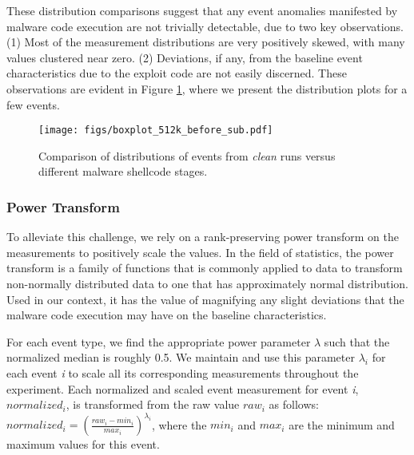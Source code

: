 \documentclass{acm_proc_article-sp}
\begin{document}

These distribution comparisons suggest that any event anomalies manifested by malware code execution are not trivially detectable, due to two key observations. (1) Most of the measurement distributions are very positively skewed, with many values clustered near zero. (2) Deviations, if any, from the baseline event characteristics due to the exploit code are not easily discerned. These observations are evident in Figure \ref{fig:univariate_before_sub}, where we present the distribution plots for a few events.

\begin{figure}
  \centering
  \texttt{[image: figs/boxplot\_512k\_before\_sub.pdf]}
  \caption{Comparison of distributions of events from \textit{clean} runs versus different malware shellcode stages.}
  \label{fig:univariate_before_sub}
\end{figure}

\subsubsection{Power Transform}

To alleviate this challenge, we rely on a rank-preserving power transform on the measurements to positively scale the values. In the field of statistics, the power transform is a family of functions that is commonly applied to data to transform non-normally distributed data to one that has approximately normal distribution. Used in our context, it has the value of magnifying any slight deviations that the malware code execution may have on the baseline characteristics.

For each event type, we find the appropriate power parameter $\lambda$ such that the normalized median is roughly 0.5. We maintain and use this parameter $\lambda_i$ for each event \textit{i} to scale all its corresponding measurements throughout the experiment. Each normalized and scaled event measurement for event \textit{i}, $normalized_i$, is transformed from the raw value $raw_i$ as follows: $normalized_i = {(\frac{raw_i - min_i}{max_i})}^{{\lambda}_i}$, where the $min_i$ and $max_i$ are the minimum and maximum values for this event.
\end{document}
